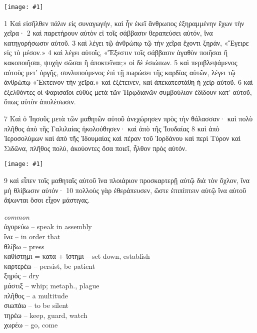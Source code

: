 \documentclass[10pt,a5paper,twoside,twocolumn]{book}
\newcommand{\newchapter}{\stepcounter{chapter}}
\newcommand{\fig}[1]{\texttt{[image: \#1]}\label{fig:#1}}
\newcommand*\cleartoleftpage{%
  \ifodd\value{page}\hbox{}\clearpage\fi
}
\newcommand{\sceneseparator}{%
  \vspace{-0.7\baselineskip}%
  \hspace{-0.01\textwidth}\noindent\makebox[\linewidth]{\resizebox{0.15\linewidth}{1pt}{$\bullet$}}%
  \vspace{-0.2\baselineskip}
}
\newenvironment{facing}{\cleartoleftpage}{\clearpage\pagebreak}
\newenvironment{help}{\clearpage}{}
\newenvironment{helpsec}{\begin{minipage}[t]{\textwidth}\begin{multicols}{2}}{\end{multicols}\end{minipage}}
\newenvironment{vocab}{\begin{helpsec}}{\end{helpsec}}
\begin{document}
\newchapter

\begin{facing}

\fig{03-01} %

\enlargethispage{\baselineskip}

1 Καὶ εἰσῆλθεν πάλιν εἰς συναγωγήν, καὶ ἦν ἐκεῖ ἄνθρωπος ἐξηραμμένην ἔχων τὴν χεῖρα· 2 καὶ παρετήρουν αὐτὸν εἰ τοῖς σάββασιν θεραπεύσει αὐτόν, ἵνα κατηγορήσωσιν αὐτοῦ. 
3 καὶ λέγει τῷ ἀνθρώπῳ τῷ τὴν χεῖρα ἔχοντι ξηράν, «Ἔγειρε εἰς τὸ μέσον.»
4 καὶ λέγει αὐτοῖς, «Ἔξεστιν τοῖς σάββασιν ἀγαθὸν ποιῆσαι ἢ κακοποιῆσαι, ψυχὴν σῶσαι ἢ ἀποκτεῖναι;» οἱ δὲ ἐσιώπων.
5 καὶ περιβλεψάμενος αὐτοὺς μετ’ ὀργῆς, συνλυπούμενος ἐπὶ τῇ πωρώσει τῆς καρδίας αὐτῶν, λέγει τῷ ἀνθρώπῳ «Ἔκτεινον τὴν χεῖρα.»
 καὶ ἐξέτεινεν, καὶ ἀπεκατεστάθη ἡ χεὶρ αὐτοῦ. 
6 καὶ ἐξελθόντες οἱ Φαρισαῖοι εὐθὺς μετὰ τῶν Ἡρῳδιανῶν συμβούλιον ἐδίδουν κατ’ αὐτοῦ, ὅπως αὐτὸν ἀπολέσωσιν. 	

\sceneseparator

7 Καὶ ὁ Ἰησοῦς μετὰ τῶν μαθητῶν αὐτοῦ ἀνεχώρησεν πρὸς τὴν θάλασσαν· καὶ πολὺ πλῆθος ἀπὸ τῆς Γαλιλαίας ἠκολούθησεν· καὶ ἀπὸ τῆς Ἰουδαίας 8 καὶ ἀπὸ Ἱεροσολύμων καὶ ἀπὸ τῆς Ἰδουμαίας καὶ πέραν τοῦ Ἰορδάνου καὶ περὶ Τύρον καὶ Σιδῶνα, πλῆθος πολύ, ἀκούοντες ὅσα ποιεῖ, ἦλθον πρὸς αὐτόν. 

\enlargethispage{\baselineskip}

\fig{03-09} %

9 καὶ εἶπεν τοῖς μαθηταῖς αὐτοῦ ἵνα πλοιάριον προσκαρτερῇ αὐτῷ διὰ τὸν ὄχλον, ἵνα μὴ θλίβωσιν αὐτόν· 10 πολλοὺς γὰρ ἐθεράπευσεν, ὥστε ἐπιπίπτειν αὐτῷ ἵνα αὐτοῦ ἅψωνται ὅσοι εἶχον μάστιγας. 

\begin{help}
\begin{vocab}
\emph{common}\\
ἀγορεύω -- speak in assembly\\
ἵνα -- in order that\\
θλίβω -- press\\
καθίστημι = κατα + ἵστημι -- set down, establish\\
καρτερέω -- persist, be patient\\
ξηρός -- dry\\
μάστιξ -- whip; metaph., plague\\
πλῆθος -- a multitude\\
σιωπάω -- to be silent\\
τηρέω -- keep, guard, watch\\
χωρέω -- go, come\\


\end{vocab}
\end{help}
\end{facing}
\end{document}
